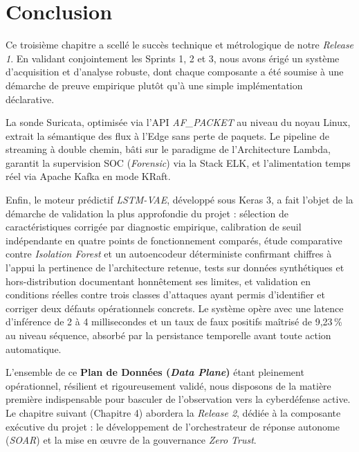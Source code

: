 \section{Conclusion}

Ce troisième chapitre a scellé le succès technique et métrologique de notre \textit{Release 1}. En validant conjointement les Sprints 1, 2 et 3, nous avons érigé un système d'acquisition et d'analyse robuste, dont chaque composante a été soumise à une démarche de preuve empirique plutôt qu'à une simple implémentation déclarative.

La sonde Suricata, optimisée via l'API \textit{AF\_PACKET} au niveau du noyau Linux, extrait la sémantique des flux à l'Edge sans perte de paquets. Le pipeline de streaming à double chemin, bâti sur le paradigme de l'Architecture Lambda, garantit la supervision SOC (\textit{Forensic}) via la Stack ELK, et l'alimentation temps réel via Apache Kafka en mode KRaft.

Enfin, le moteur prédictif \textit{LSTM-VAE}, développé sous Keras 3, a fait l'objet de la démarche de validation la plus approfondie du projet : sélection de caractéristiques corrigée par diagnostic empirique, calibration de seuil indépendante en quatre points de fonctionnement comparés, étude comparative contre \textit{Isolation Forest} et un autoencodeur déterministe confirmant chiffres à l'appui la pertinence de l'architecture retenue, tests sur données synthétiques et hors-distribution documentant honnêtement ses limites, et validation en conditions réelles contre trois classes d'attaques ayant permis d'identifier et corriger deux défauts opérationnels concrets. Le système opère avec une latence d'inférence de 2 à 4 millisecondes et un taux de faux positifs maîtrisé de 9,23\,\% au niveau séquence, absorbé par la persistance temporelle avant toute action automatique.

L'ensemble de ce \textbf{Plan de Données (\textit{Data Plane})} étant pleinement opérationnel, résilient et rigoureusement validé, nous disposons de la matière première indispensable pour basculer de l'observation vers la cyberdéfense active. Le chapitre suivant (Chapitre 4) abordera la \textit{Release 2}, dédiée à la composante exécutive du projet : le développement de l'orchestrateur de réponse autonome (\textit{SOAR}) et la mise en œuvre de la gouvernance \textit{Zero Trust}.